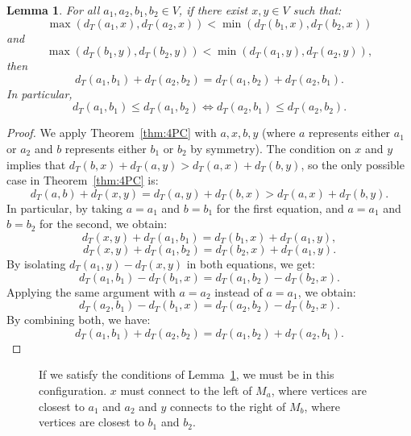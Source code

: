 \documentclass[11pt, letter]{article}
\newtheorem{lemma}[theorem]{Lemma}
\theoremstyle{remark}
\begin{document}
\begin{lemma}\label{lem:4-PC-split}
For all $a_1, a_2, b_1, b_2 \in V$, if there exist $x, y \in V$ such that:
$$
\max(d_T(a_1, x), d_T(a_2, x)) < \min(d_T(b_1, x), d_T(b_2, x))
$$
and
$$
\max(d_T(b_1, y), d_T(b_2, y)) < \min(d_T(a_1, y), d_T(a_2, y)),
$$
then
$$
d_T(a_1, b_1) + d_T(a_2, b_2) = d_T(a_1, b_2) + d_T(a_2, b_1).
$$
In particular,
$$
d_T(a_1, b_1) \leq d_T(a_1, b_2) \iff d_T(a_2, b_1) \leq d_T(a_2, b_2).
$$

\end{lemma}

\begin{proof}
We apply Theorem~\ref{thm:4PC} with $a, x, b, y$ (where $a$ represents either $a_1$ or $a_2$ and $b$ represents either $b_1$ or $b_2$ by symmetry). The condition on $x$ and $y$ implies that $d_T(b, x) + d_T(a, y) > d_T(a, x) + d_T(b, y)$,
so the only possible case in Theorem~\ref{thm:4PC} is:
$$
d_T(a, b) + d_T(x, y) = d_T(a, y) + d_T(b, x) > d_T(a, x) + d_T(b, y). \label{4-PC-guarantee}
$$
In particular, by taking $a = a_1$ and $b = b_1$ for the first equation, and $a = a_1$ and $b = b_2$ for the second, we obtain:
$$
d_T(x, y) + d_T(a_1, b_1) = d_T(b_1, x) + d_T(a_1, y),
$$
$$
d_T(x, y) + d_T(a_1, b_2) = d_T(b_2, x) + d_T(a_1, y).
$$
By isolating $d_T(a_1, y) - d_T(x, y)$ in both equations, we get:
$$
d_T(a_1, b_1) - d_T(b_1, x) = d_T(a_1, b_2) - d_T(b_2, x).
$$
Applying the same argument with $a = a_2$ instead of $a = a_1$, we obtain:
$$
d_T(a_2, b_1) - d_T(b_1, x) = d_T(a_2, b_2) - d_T(b_2, x).
$$
By combining both, we have:
$$
d_T(a_1, b_1) + d_T(a_2, b_2) = d_T(a_1, b_2) + d_T(a_2, b_1).
$$

\end{proof}
\begin{figure}
    \centering
    \caption{If we satisfy the conditions of Lemma~\ref{lem:4-PC-split}, we must be in this configuration. $x$ must connect to the left of $M_a$, where vertices are closest to $a_1$ and $a_2$ and $y$ connects to the right of $M_b$, where vertices are closest to $b_1$ and $b_2$.}
    
\end{figure}
\end{document}
